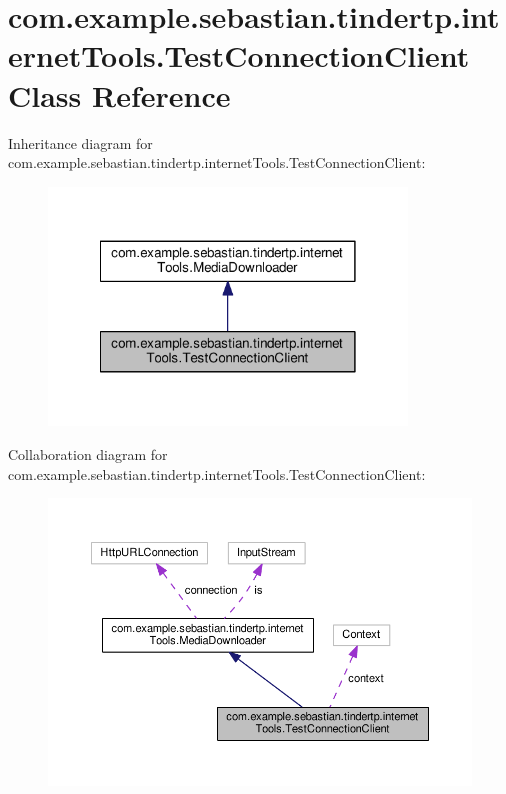 \hypertarget{classcom_1_1example_1_1sebastian_1_1tindertp_1_1internetTools_1_1TestConnectionClient}{}\section{com.\+example.\+sebastian.\+tindertp.\+internet\+Tools.\+Test\+Connection\+Client Class Reference}
\label{classcom_1_1example_1_1sebastian_1_1tindertp_1_1internetTools_1_1TestConnectionClient}


Inheritance diagram for com.\+example.\+sebastian.\+tindertp.\+internet\+Tools.\+Test\+Connection\+Client\+:\nopagebreak
\begin{figure}[H]
\begin{center}
\leavevmode
\includegraphics[width=270pt]{classcom_1_1example_1_1sebastian_1_1tindertp_1_1internetTools_1_1TestConnectionClient__inherit__graph}
\end{center}
\end{figure}


Collaboration diagram for com.\+example.\+sebastian.\+tindertp.\+internet\+Tools.\+Test\+Connection\+Client\+:\nopagebreak
\begin{figure}[H]
\begin{center}
\leavevmode
\includegraphics[width=350pt]{classcom_1_1example_1_1sebastian_1_1tindertp_1_1internetTools_1_1TestConnectionClient__coll__graph}
\end{center}
\end{figure}
